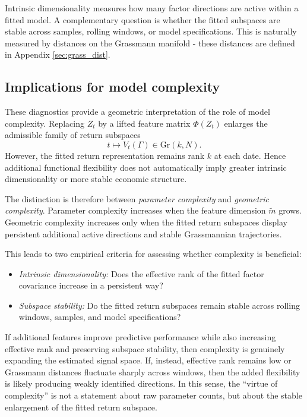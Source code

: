 \documentclass[11pt,letterpaper]{article}
\newcommand{\gr}{\mathrm{Gr}}
\begin{document}
Intrinsic dimensionality measures how many factor directions are active within a fitted model. A complementary question is whether the fitted subspaces are stable across samples, rolling windows, or model specifications. This is naturally measured by distances on the Grassmann manifold - these distances are defined in Appendix \ref{sec:grass_dist}.


\subsection{Implications for model complexity}
\label{subsec:complexity-implications}

These diagnostics provide a geometric interpretation of the role of model complexity. Replacing $Z_t$ by a lifted feature matrix $\Phi(Z_t)$ enlarges the admissible family of return subspaces
\begin{equation*}
t\mapsto V_t(\Gamma)\in\gr(k,N).
\end{equation*}
However, the fitted return representation remains rank $k$ at each date. Hence additional functional flexibility does not automatically imply greater intrinsic dimensionality or more stable economic structure.

The distinction is therefore between \emph{parameter complexity} and \emph{geometric complexity}. Parameter complexity increases when the feature dimension $\tilde m$ grows. Geometric complexity increases only when the fitted return subspaces display persistent additional active directions and stable Grassmannian trajectories.

This leads to two empirical criteria for assessing whether complexity is beneficial:
\begin{itemize}
\item[(i)] \emph{Intrinsic dimensionality:} Does the effective rank of the fitted factor covariance increase in a persistent way?
\item[(ii)] \emph{Subspace stability:} Do the fitted return subspaces remain stable across rolling windows, samples, and model specifications?
\end{itemize}

If additional features improve predictive performance while also increasing effective rank and preserving subspace stability, then complexity is genuinely expanding the estimated signal space. If, instead, effective rank remains low or Grassmann distances fluctuate sharply across windows, then the added flexibility is likely producing weakly identified directions. In this sense, the ``virtue of complexity'' is not a statement about raw parameter counts, but about the stable enlargement of the fitted return subspace.
\end{document}
